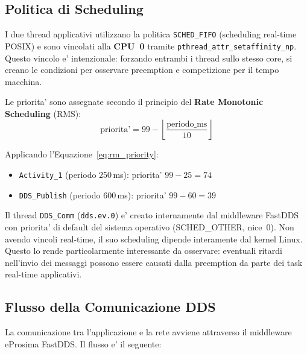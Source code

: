 \subsection{Politica di Scheduling}
\label{subsec:scheduling}

I due thread applicativi utilizzano la politica \texttt{SCHED\_FIFO}
(scheduling real-time POSIX) e sono vincolati alla \textbf{CPU~0} tramite
\texttt{pthread\_attr\_setaffinity\_np}. Questo vincolo e' intenzionale:
forzando entrambi i thread sullo stesso core, si creano le condizioni per
osservare preemption e competizione per il tempo macchina.

Le priorita' sono assegnate secondo il principio del
\textbf{Rate Monotonic Scheduling} (RMS):
\begin{equation}
    \text{priorita'} = 99 - \left\lfloor \frac{\text{periodo\_ms}}{10} \right\rfloor
    \label{eq:rm_priority}
\end{equation}

Applicando l'Equazione~\ref{eq:rm_priority}:
\begin{itemize}
    \item \texttt{Activity\_1} (periodo 250\,ms): priorita' $99 - 25 = 74$
    \item \texttt{DDS\_Publish} (periodo 600\,ms): priorita' $99 - 60 = 39$
\end{itemize}

Il thread \texttt{DDS\_Comm} (\texttt{dds.ev.0}) e' creato internamente
dal middleware FastDDS con priorita' di default del sistema operativo
(SCHED\_OTHER, nice~0). Non avendo vincoli real-time, il suo scheduling
dipende interamente dal kernel Linux. Questo lo rende particolarmente
interessante da osservare: eventuali ritardi nell'invio dei messaggi
possono essere causati dalla preemption da parte dei task real-time
applicativi.

\subsection{Flusso della Comunicazione DDS}
\label{subsec:dds_flow}

La comunicazione tra l'applicazione e la rete avviene attraverso il
middleware eProsima FastDDS. Il flusso e' il seguente:

